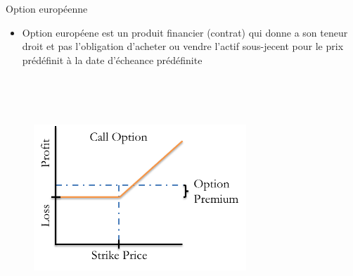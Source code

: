\documentclass[10pt]{beamer}
\begin{document}
\begin{frame}{Option européenne}{}
  \begin{itemize}
    \item Option européene est un produit financier (contrat) qui donne a son teneur droit et pas l'obligation d'acheter ou vendre l'actif sous-jecent pour le prix prédéfinit à la date d'écheance prédéfinite\\~\\
  \end{itemize}
  \begin{figure}[!tbp]
  \centering
  
    \includegraphics[width=8cm,height=8cm,keepaspectratio]{AAUgraphics/call.png}
   
\end{figure}
  
\end{frame}
\end{document}
